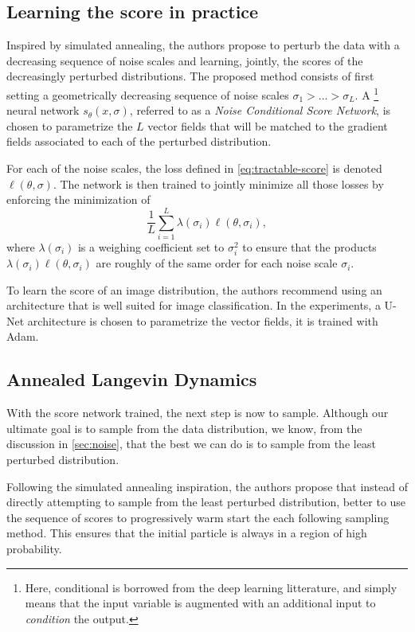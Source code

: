 \documentclass[11pt,twoside]{article}
\begin{document}
\subsection{Learning the score in practice}

Inspired by simulated annealing, the authors propose to perturb the data with a decreasing sequence of noise scales and learning, jointly, the scores of the decreasingly perturbed distributions. The proposed method consists of first setting a geometrically decreasing sequence of noise scales $\sigma_1 > \dots > \sigma_L$. A \footnote{Here, conditional is borrowed from the deep learning litterature, and simply means that the input variable is augmented with an additional input to \textit{condition} the output.} neural network $s_\theta(x, \sigma)$, referred to as a \textit{Noise Conditional Score Network}, is chosen to parametrize the $L$  vector fields that will be matched to the gradient fields associated to each of the perturbed distribution.

For each of the noise scales, the loss defined in \eqref{eq:tractable-score} is denoted $\ell(\theta, \sigma)$. The network is then trained to jointly minimize all those losses by enforcing the minimization of
\[
\frac{1}{L} \sum_{i=1}^{L}\lambda(\sigma_i) \ell(\theta, \sigma_i),
\]
where $\lambda(\sigma_i)$ is a weighing coefficient set to $\sigma_i^2$ to ensure that the products \(\lambda(\sigma_i) \ell(\theta, \sigma_i)\) are roughly of the same order for each noise scale $\sigma_i$. 

To learn the score of an image distribution, the authors recommend using an architecture that is well suited for image classification. In the experiments, a U-Net architecture is chosen to parametrize the vector fields, it is trained with Adam.


\subsection{Annealed Langevin Dynamics}

With the score network trained, the next step is now to sample. Although our ultimate goal is to sample from the data distribution, we know, from the discussion in \ref{sec:noise}, that the best we can do is to sample from the least perturbed distribution.

Following the simulated annealing inspiration, the authors propose that instead of directly attempting to sample from the least perturbed distribution, better to use the sequence of scores to progressively warm start the each following sampling method. This ensures that the initial particle is always in a region of high probability.
\end{document}
